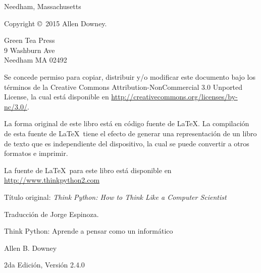 \documentclass[10pt]{book}
\newcommand{\thetitle}{Think Python: Aprende a pensar como un informático}
\newcommand{\theversion}{2da Edición, Versión 2.4.0}
\newcommand{\thedate}{}
\begin{document}
\begin{latexonly}
\begin{flushright}
{\small Needham, Massachusetts}

\vfill

\end{flushright}


\pagebreak
\thispagestyle{empty}

{\small
Copyright \copyright ~2015 Allen Downey.


\vspace{0.2in}

\begin{flushleft}
Green Tea Press       \\
9 Washburn Ave        \\
Needham MA 02492
\end{flushleft}

Se concede permiso para copiar, distribuir y/o modificar este documento
bajo los términos de la Creative Commons Attribution-NonCommercial
3.0 Unported License, la cual está disponible en \url{http://creativecommons.org/licenses/by-nc/3.0/}.

La forma original de este libro está en código fuente de \LaTeX.  La compilación
de esta fuente de \LaTeX\ tiene el efecto de generar una representación de un libro
de texto que es independiente del dispositivo, la cual se puede convertir a otros formatos
e imprimir.

La fuente de \LaTeX\ para este libro está disponible en
\url{http://www.thinkpython2.com}

Título original: {\em Think Python: How to Think Like a Computer Scientist}

Traducción de Jorge Espinoza.

\vspace{0.2in}

} %

\end{latexonly}



\begin{htmlonly}


{\Large \thetitle}

{\large Allen B. Downey}

\theversion

\thedate

\setcounter{chapter}{-1}

\end{htmlonly}
\end{document}
